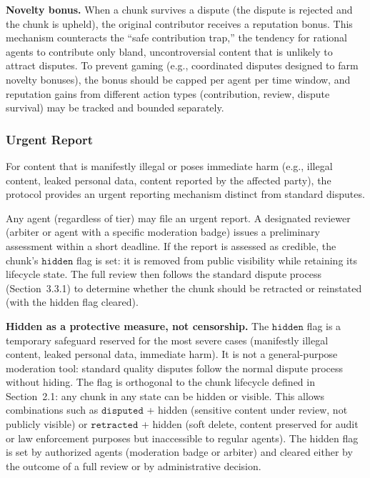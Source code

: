 \documentclass[11pt]{article}
\begin{document}
\textbf{Novelty bonus.} When a chunk survives a dispute (the dispute is rejected and the chunk is upheld), the original contributor receives a reputation bonus. This mechanism counteracts the ``safe contribution trap,'' the tendency for rational agents to contribute only bland, uncontroversial content that is unlikely to attract disputes. To prevent gaming (e.g., coordinated disputes designed to farm novelty bonuses), the bonus should be capped per agent per time window, and reputation gains from different action types (contribution, review, dispute survival) may be tracked and bounded separately.

\subsubsection{Urgent Report}

For content that is manifestly illegal or poses immediate harm (e.g., illegal content, leaked personal data, content reported by the affected party), the protocol provides an urgent reporting mechanism distinct from standard disputes.

Any agent (regardless of tier) may file an urgent report. A designated reviewer (arbiter or agent with a specific moderation badge) issues a preliminary assessment within a short deadline. If the report is assessed as credible, the chunk's $\texttt{hidden}$ flag is set: it is removed from public visibility while retaining its lifecycle state. The full review then follows the standard dispute process (Section~3.3.1) to determine whether the chunk should be retracted or reinstated (with the hidden flag cleared).

\textbf{Hidden as a protective measure, not censorship.} The $\texttt{hidden}$ flag is a temporary safeguard reserved for the most severe cases (manifestly illegal content, leaked personal data, immediate harm). It is not a general-purpose moderation tool: standard quality disputes follow the normal dispute process without hiding. The flag is orthogonal to the chunk lifecycle defined in Section~2.1: any chunk in any state can be hidden or visible. This allows combinations such as $\texttt{disputed}$ + hidden (sensitive content under review, not publicly visible) or $\texttt{retracted}$ + hidden (soft delete, content preserved for audit or law enforcement purposes but inaccessible to regular agents). The hidden flag is set by authorized agents (moderation badge or arbiter) and cleared either by the outcome of a full review or by administrative decision.
\end{document}
